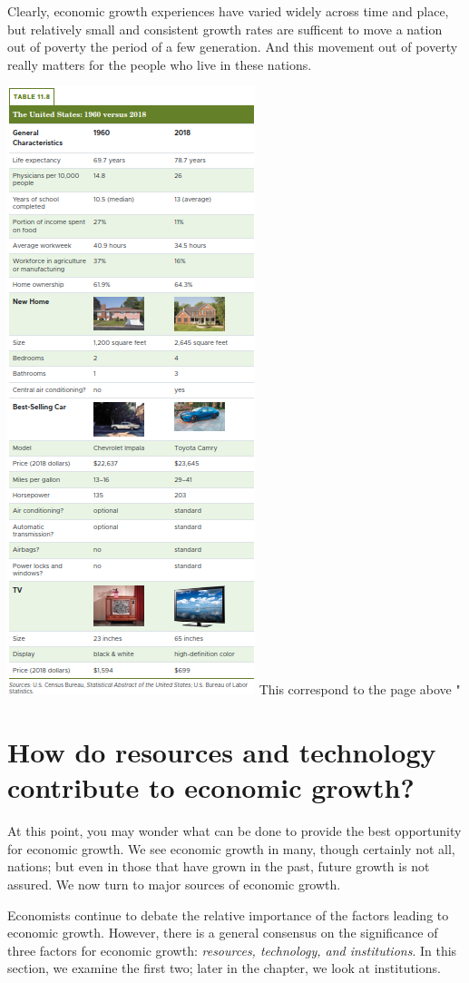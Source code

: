 \documentclass[11pt]{article} %
\theoremstyle{plain}
\theoremstyle{definition}
\begin{document}
Clearly, economic growth experiences have varied widely across time and place, but relatively small and consistent growth rates are sufficent to move a nation out of poverty the period of a few generation. And this movement out of poverty really matters for the people who live in these nations.
\begin{center}
\includegraphics[scale=0.5]{../../images/Chapter 11/Table 11.8.png} This correspond to the page above "%
\end{center}

\newpage

\section*{How do resources and technology contribute to economic growth?}
At this point, you may wonder what can be done to provide the best opportunity for economic growth. We see economic growth in many, though certainly not all, nations; but even in those that have grown in the past, future growth is not assured. We now turn to major sources of economic growth.

Economists continue to debate the relative importance of the factors leading to economic growth. However, there is a general consensus on the significance of three factors for economic growth: \textit{resources, technology, and institutions}. In this section, we examine the first two; later in the chapter, we look at institutions.
\end{document}
